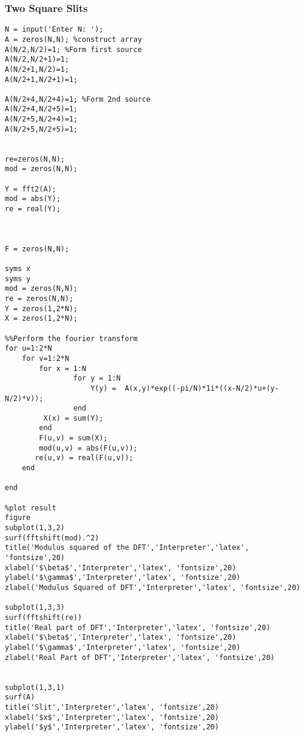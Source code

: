 \documentclass[a4paper,11pt]{article}
\begin{document}
\subsubsection{Two Square Slits}
\begin{lstlisting}[style=matlab-editor]
N = input('Enter N: ');
A = zeros(N,N); %construct array
A(N/2,N/2)=1; %Form first source
A(N/2,N/2+1)=1;
A(N/2+1,N/2)=1;
A(N/2+1,N/2+1)=1;

A(N/2+4,N/2+4)=1; %Form 2nd source
A(N/2+4,N/2+5)=1;
A(N/2+5,N/2+4)=1;
A(N/2+5,N/2+5)=1;


re=zeros(N,N);
mod = zeros(N,N);

Y = fft2(A);
mod = abs(Y);
re = real(Y);



F = zeros(N,N);
            
syms x
syms y
mod = zeros(N,N);
re = zeros(N,N);
Y = zeros(1,2*N);
X = zeros(1,2*N);

%%Perform the fourier transform
for u=1:2*N
    for v=1:2*N
        for x = 1:N
                for y = 1:N
                    Y(y) =  A(x,y)*exp((-pi/N)*1i*((x-N/2)*u+(y-N/2)*v));
                end
         X(x) = sum(Y);
        end
        F(u,v) = sum(X);
        mod(u,v) = abs(F(u,v));
       re(u,v) = real(F(u,v));
    end
    
end

%plot result
figure
subplot(1,3,2)
surf(fftshift(mod).^2)
title('Modulus squared of the DFT','Interpreter','latex', 'fontsize',20)
xlabel('$\beta$','Interpreter','latex', 'fontsize',20)
ylabel('$\gamma$','Interpreter','latex', 'fontsize',20)
zlabel('Modulus Squared of DFT','Interpreter','latex', 'fontsize',20)

subplot(1,3,3)
surf(fftshift(re))
title('Real part of DFT','Interpreter','latex', 'fontsize',20)
xlabel('$\beta$','Interpreter','latex', 'fontsize',20)
ylabel('$\gamma$','Interpreter','latex', 'fontsize',20)
zlabel('Real Part of DFT','Interpreter','latex', 'fontsize',20)


subplot(1,3,1)
surf(A)
title('Slit','Interpreter','latex', 'fontsize',20)
xlabel('$x$','Interpreter','latex', 'fontsize',20)
ylabel('$y$','Interpreter','latex', 'fontsize',20)
\end{lstlisting}
\end{document}
